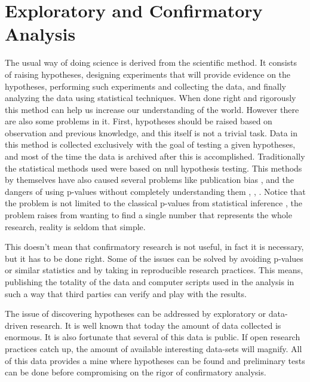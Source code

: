 
\section{Exploratory and Confirmatory Analysis}

The usual way of doing science is derived from the scientific method. It consists of raising hypotheses, designing experiments that will provide evidence on the hypotheses, performing such experiments and collecting the data, and finally analyzing the data using statistical techniques. When done right and rigorously this method can help us increase our understanding of the world. However there are also some problems in it. First, hypotheses should be raised based on observation and previous knowledge, and this itself is not a trivial task. Data in this method is collected exclusively with the goal of testing a given hypotheses, and most of the time the data is archived after this is accomplished. Traditionally the statistical methods used were based on null hypothesis testing. This methods by themselves have also caused several problems like publication bias \autocite{ioannidis_why_2005}, and the dangers of using p-values without completely understanding them \autocite{halsey_fickle_2015}, \autocite{nuzzo_scientific_2014}, \autocite{woolston_psychology_2015}. Notice that the problem is not limited to the classical p-values from statistical inference \autocite{gelman_so-called_2011}, the problem raises from wanting to find a single number that represents the whole research, reality is seldom that simple.    

This doesn't mean that confirmatory research is not useful, in fact it is necessary, but it has to be done right. Some of the issues can be solved by avoiding p-values or similar statistics and by taking in reproducible research practices. This means, publishing the totality of the data and computer scripts used in the analysis in such a way that third parties can verify and play with the results. 

The issue of discovering hypotheses can be addressed by exploratory or data-driven research. It is well known that today the amount of data collected is enormous. It is also fortunate that several of this data is public. If open research practices catch up, the amount of available interesting data-sets will magnify. All of this data provides a mine where hypotheses can be found and preliminary tests can be done before compromising on the rigor of confirmatory analysis. 

